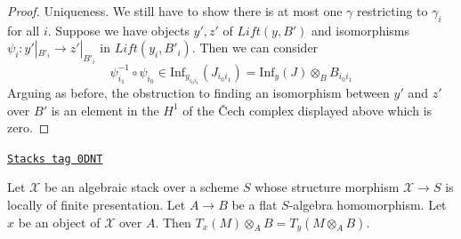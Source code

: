 \begin{proof}
\medskip\noindent
Uniqueness. We still have to show there is at most one $\gamma$ restricting
to $\gamma_i$ for all $i$. Suppose we have objects $y', z'$ of
$\textit{Lift}(y, B')$ and isomorphisms $\psi_i : y'|_{B'_i} \to z'|_{B'_i}$
in $\textit{Lift}(y_i, B'_i)$. Then we can consider
$$
\psi_{i_1}^{-1} \circ \psi_{i_0} \in
\text{Inf}_{y_{i_0i_1}}(J_{i_0i_1}) =
\text{Inf}_y(J) \otimes_B B_{i_0i_1}
$$
Arguing as before, the obstruction to finding an isomorphism between
$y'$ and $z'$ over $B'$ is an element in the $H^1$ of the
{\v C}ech complex displayed above which is zero.
\end{proof}

\begin{lemma}
\label{stacks-more-morphisms-lemma-T-quasi-coherent}
\href{https://stacks.math.columbia.edu/tag/0DNT}{\texttt{Stacks tag 0DNT}}

Let $\mathcal{X}$ be an algebraic stack over a scheme $S$ whose
structure morphism $\mathcal{X} \to S$ is locally of finite presentation.
Let $A \to B$ be a flat $S$-algebra homomorphism.
Let $x$ be an object of $\mathcal{X}$ over $A$.
Then $T_x(M) \otimes_A B = T_y(M \otimes_A B)$.
\end{lemma}

